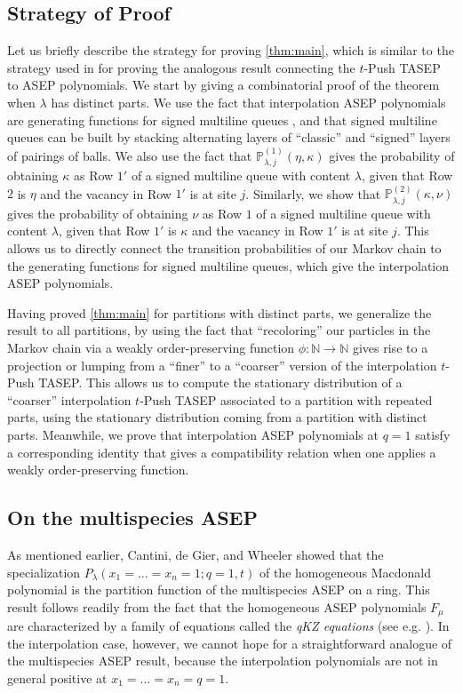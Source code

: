 \documentclass[12pt]{amsart}
\theoremstyle{definition}
\newcommand{\NN}{\mathbb N}
\newcommand{\PPone}[1]{\mathbb P^{(1)}_{#1}}
\newcommand{\PPtwo}[1]{\mathbb P^{(2)}_{#1}}
\begin{document}
\subsection{Strategy of Proof}
Let us briefly describe the strategy for proving \cref{thm:main}, which is similar to the strategy used in 
\cite{AyyerMartinWilliams2025} for proving the analogous result connecting the $t$-Push TASEP to ASEP polynomials.
We start by giving a combinatorial proof of the theorem
when $\lambda$ has distinct parts.  We use the fact that 
interpolation ASEP polynomials are generating functions for 
signed multiline queues \cite{BenDaliWilliams2025}, 
and that signed multiline queues can be built by stacking alternating layers of ``classic'' and ``signed'' layers of pairings of balls.  We also use the fact that
$\PPone{\lambda,j}(\eta, \kappa)$ gives the probability of obtaining
$\kappa$ as Row $1'$ of a signed multiline queue with content $\lambda$, given that Row $2$ is $\eta$ and the vacancy in Row $1'$ is at site $j$.  Similarly, we show that 
$\PPtwo{\lambda,j}(\kappa, \nu)$ gives the probability of obtaining $\nu$ as Row $1$ of a signed multiline queue with content $\lambda$, given that Row $1'$ is $\kappa$ and the vacancy in Row $1'$ is at site $j$.  This allows us to directly connect the transition probabilities of our Markov chain to the generating functions for signed multiline queues, which give the interpolation ASEP polynomials.

Having proved \cref{thm:main} for partitions with distinct parts, we generalize the result to all partitions, by 
using the fact that ``recoloring'' our particles in the Markov chain via a weakly order-preserving function $\phi:\NN \to \NN$ gives rise to a projection or lumping from a ``finer'' to a ``coarser'' version of the interpolation $t$-Push TASEP.  This allows us to compute the stationary distribution of a ``coarser'' interpolation $t$-Push TASEP associated to a partition with repeated parts, using the stationary distribution coming from a partition with distinct parts.  Meanwhile, we prove that interpolation ASEP polynomials at $q=1$ satisfy a corresponding identity that gives a compatibility relation when one applies a weakly order-preserving function.



\bigskip
\subsection{On the multispecies ASEP}
As mentioned earlier,   Cantini, de Gier, and Wheeler \cite{CantinideGierWheeler2015} showed that
the specialization $P_{\lambda}(x_1=\dots=x_n=1;q=1,t)$ of the homogeneous Macdonald polynomial 
 is the partition function of the multispecies ASEP on a ring. This result follows readily from the fact that the homogeneous ASEP polynomials $F_\mu$ are characterized by a family of equations called the \emph{qKZ equations} (see e.g. \cite[Equations (17) to (19)]{CantinideGierWheeler2015}).  In the interpolation case, however, 
 we cannot hope for a straightforward analogue of the multispecies ASEP result, because 
 the interpolation polynomials are not in general  positive at $x_1=\dots=x_n=q=1$.
\end{document}
